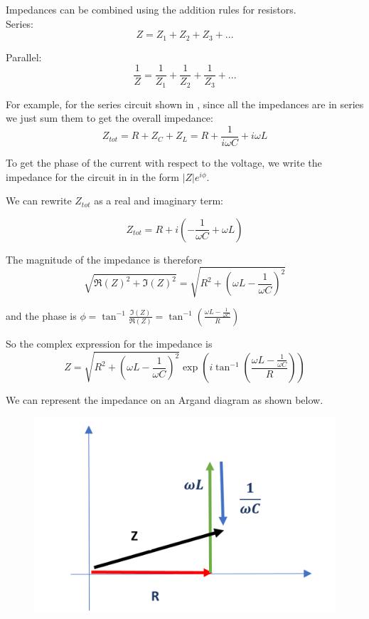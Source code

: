 \documentclass[
]{book}
\numberwithin{equation}{section}
\begin{document}
Impedances can be combined using the addition rules for resistors.\\
Series:
\begin{equation}
\label{eq:ImpedanceSeries}
 Z = Z_1 + Z_2 + Z_3 + ...
\end{equation}

Parallel:
\begin{equation}
\label{eq:ImpParallel}
\frac{1}{Z} = \frac{1}{Z_1} + \frac{1}{Z_2} + \frac{1}{Z_3} + ...
\end{equation}

For example, for the series circuit shown in , since all the impedances
are in series we just sum them to get the overall impedance:
\begin{equation}
\label{eq:ImpOverall}
Z_{tot} = R + Z_C + Z_L = R + \frac{1}{i\omega C} + i\omega L
\end{equation}

To get the phase of the current with respect to the voltage, we write
the impedance for the circuit in in the form \(|Z| e^{i\phi}\).

We can rewrite \(Z_{tot}\) as a real and imaginary term:

\begin{equation}
\label{eq:ZReal-Im}
Z_{tot} = R + i\left( - \frac{1}{\omega C} + \omega L \right) 
\end{equation}

The magnitude of the impedance is therefore
\begin{equation}
\label{eq:Zmag}
\sqrt{ \Re(Z)^2 + \Im(Z)^2 } = \sqrt{ R^2 + \left( \omega L - \frac{1}{\omega C} \right)^2 }
\end{equation}

and the phase is
\(\phi = \tan^{-1}⁡ \frac{\Im(Z)}{ \Re(Z)}= \tan^{-1}⁡\left( \frac{ \omega L - \frac{1}{\omega C} }{R} \right)\)

So the complex expression for the impedance is
\begin{equation}
\label{eq:complexImpedance}
Z = \sqrt{ R^2 + \left(\omega L - \frac{1}{\omega C} \right)^2 } \exp⁡ \left( i \tan^{-1}⁡ \left( \frac{\omega L - \frac{1}{\omega C} }{R} \right)\right)
\end{equation}

We can represent the impedance on an Argand diagram as shown below.

\begin{figure}

{\centering \includegraphics[width=0.7\linewidth]{Figures/Z_argand} 

}

\end{figure}
\end{document}
